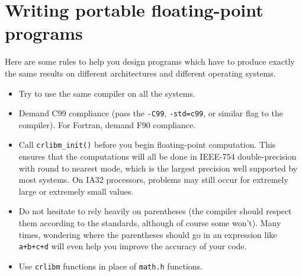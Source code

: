 \section{Writing portable floating-point programs}

Here are some rules to help you design programs which have to
produce exactly the same results on different architectures and
different operating systems.
\begin{itemize}
\item Try to use the same compiler on all the systems.
\item Demand C99 compliance (pass the \texttt{-C99},
  \texttt{-std=c99}, or similar flag to the compiler). For Fortran,
  demand F90 compliance.
\item Call \texttt{crlibm\_init()} before you begin floating-point
  computation. This ensures that the computations will all be done in
  IEEE-754 double-precision with round to nearest mode, which is the
  largest precision well supported by most systems. On IA32
  processors, problems may still occur for extremely large or
  extremely small values.
\item Do not hesitate to rely heavily on parentheses (the compiler
  should respect them according to the standards, although of course some
  won't). Many times, wondering where the parentheses should go in an
  expression like \texttt{a+b+c+d} will even help you improve the
  accuracy of your code.
\item Use \texttt{crlibm} functions in place of \texttt{math.h} functions.
\end{itemize}




